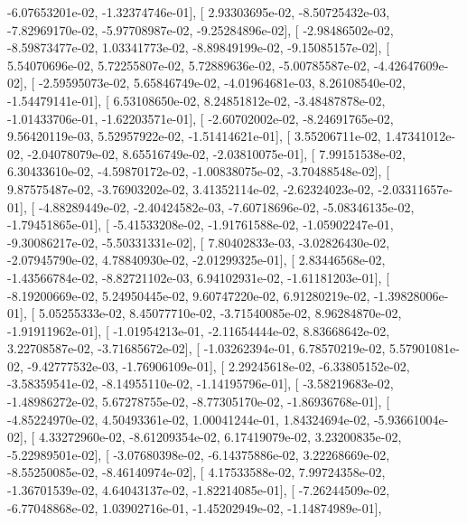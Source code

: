 \documentclass{article}
\begin{document}
         -6.07653201e-02,  -1.32374746e-01],
       [  2.93303695e-02,  -8.50725432e-03,  -7.82969170e-02,
         -5.97708987e-02,  -9.25284896e-02],
       [ -2.98486502e-02,  -8.59873477e-02,   1.03341773e-02,
         -8.89849199e-02,  -9.15085157e-02],
       [  5.54070696e-02,   5.72255807e-02,   5.72889636e-02,
         -5.00785587e-02,  -4.42647609e-02],
       [ -2.59595073e-02,   5.65846749e-02,  -4.01964681e-03,
          8.26108540e-02,  -1.54479141e-01],
       [  6.53108650e-02,   8.24851812e-02,  -3.48487878e-02,
         -1.01433706e-01,  -1.62203571e-01],
       [ -2.60702002e-02,  -8.24691765e-02,   9.56420119e-03,
          5.52957922e-02,  -1.51414621e-01],
       [  3.55206711e-02,   1.47341012e-02,  -2.04078079e-02,
          8.65516749e-02,  -2.03810075e-01],
       [  7.99151538e-02,   6.30433610e-02,  -4.59870172e-02,
         -1.00838075e-02,  -3.70488548e-02],
       [  9.87575487e-02,  -3.76903202e-02,   3.41352114e-02,
         -2.62324023e-02,  -2.03311657e-01],
       [ -4.88289449e-02,  -2.40424582e-03,  -7.60718696e-02,
         -5.08346135e-02,  -1.79451865e-01],
       [ -5.41533208e-02,  -1.91761588e-02,  -1.05902247e-01,
         -9.30086217e-02,  -5.50331331e-02],
       [  7.80402833e-03,  -3.02826430e-02,  -2.07945790e-02,
          4.78840930e-02,  -2.01299325e-01],
       [  2.83446568e-02,  -1.43566784e-02,  -8.82721102e-03,
          6.94102931e-02,  -1.61181203e-01],
       [ -8.19200669e-02,   5.24950445e-02,   9.60747220e-02,
          6.91280219e-02,  -1.39828006e-01],
       [  5.05255333e-02,   8.45077710e-02,  -3.71540085e-02,
          8.96284870e-02,  -1.91911962e-01],
       [ -1.01954213e-01,  -2.11654444e-02,   8.83668642e-02,
          3.22708587e-02,  -3.71685672e-02],
       [ -1.03262394e-01,   6.78570219e-02,   5.57901081e-02,
         -9.42777532e-03,  -1.76906109e-01],
       [  2.29245618e-02,  -6.33805152e-02,  -3.58359541e-02,
         -8.14955110e-02,  -1.14195796e-01],
       [ -3.58219683e-02,  -1.48986272e-02,   5.67278755e-02,
         -8.77305170e-02,  -1.86936768e-01],
       [ -4.85224970e-02,   4.50493361e-02,   1.00041244e-01,
          1.84324694e-02,  -5.93661004e-02],
       [  4.33272960e-02,  -8.61209354e-02,   6.17419079e-02,
          3.23200835e-02,  -5.22989501e-02],
       [ -3.07680398e-02,  -6.14375886e-02,   3.22268669e-02,
         -8.55250085e-02,  -8.46140974e-02],
       [  4.17533588e-02,   7.99724358e-02,  -1.36701539e-02,
          4.64043137e-02,  -1.82214085e-01],
       [ -7.26244509e-02,  -6.77048868e-02,   1.03902716e-01,
         -1.45202949e-02,  -1.14874989e-01],
\end{document}
